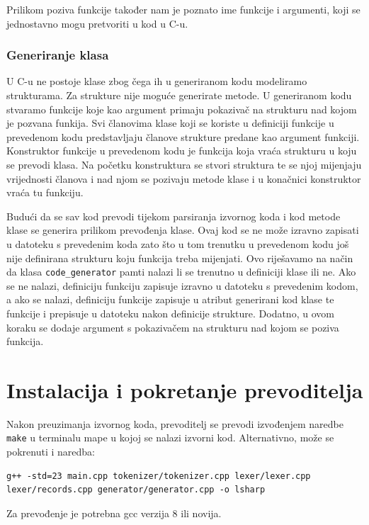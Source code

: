 \documentclass[times, utf8, zavrsni]{fer}
\begin{document}
Prilikom poziva funkcije također nam je poznato ime funkcije i argumenti, koji se jednostavno mogu
pretvoriti u kod u C-u.

\subsection{Generiranje klasa}
U C-u ne postoje klase zbog čega ih u generiranom kodu modeliramo strukturama.
Za strukture nije moguće generirate metode. U generiranom kodu stvaramo funkcije
koje kao argument primaju pokazivač na strukturu nad kojom je pozvana funkija.
Svi članovima klase koji se koriste u definiciji funkcije u prevedenom kodu predstavljaju
članove strukture predane kao argument funkciji. Konstruktor funkcije u prevedenom kodu
je funkcija koja vraća strukturu u koju se prevodi klasa. Na početku konstruktura se stvori
struktura te se njoj mijenjaju vrijednosti članova i nad njom se pozivaju metode klase i u konačnici konstruktor
vraća tu funkciju.

Budući da se sav kod prevodi tijekom parsiranja izvornog koda i kod metode klase
se generira prilikom prevođenja klase. Ovaj kod se ne može izravno zapisati u datoteku s prevedenim koda zato što u
tom trenutku u prevedenom kodu još nije definirana strukturu koju funkcija treba mijenjati. Ovo riješavamo na način da
klasa \verb|code_generator| pamti nalazi li se trenutno u definiciji klase ili ne. Ako se ne nalazi, definiciju funkciju zapisuje izravno
u datoteku s prevedenim kodom, a ako se nalazi, definiciju funkcije zapisuje u atribut generirani kod klase te funkcije i prepisuje u datoteku nakon
definicije strukture. Dodatno, u ovom koraku se dodaje argument s pokazivačem na strukturu nad kojom se poziva funkcija.

\chapter{Instalacija i pokretanje prevoditelja}
Nakon preuzimanja izvornog koda, prevoditelj se prevodi izvođenjem naredbe \verb|make| u terminalu mape u kojoj se nalazi izvorni kod. Alternativno, može se pokrenuti
i naredba:
\begin{tiny}
\begin{verbatim}
g++ -std=23 main.cpp tokenizer/tokenizer.cpp lexer/lexer.cpp lexer/records.cpp generator/generator.cpp -o lsharp
\end{verbatim}
\end{tiny}
Za prevođenje je potrebna gcc verzija 8 ili novija.
\end{document}
